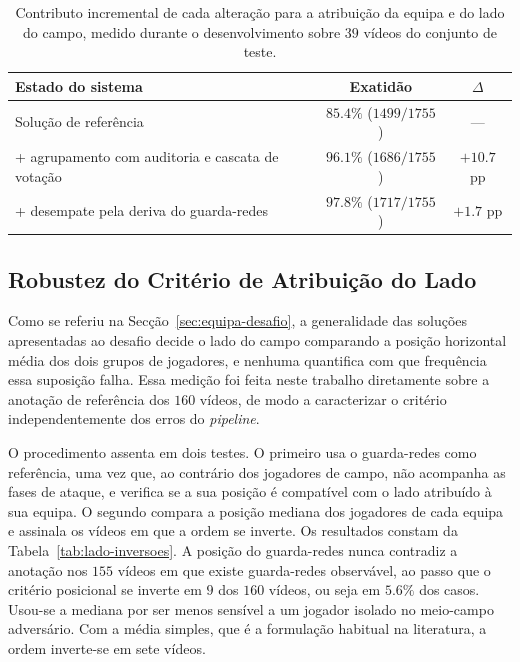 \begin{table}[htbp]
    \centering
    \caption{Contributo incremental de cada alteração para a atribuição da equipa e do lado do
    campo, medido durante o desenvolvimento sobre $39$ vídeos do conjunto de teste.}
    \label{tab:team-resultados}
    \begin{tabular}{|l|c|c|}
        \hline
        \textbf{Estado do sistema} & \textbf{Exatidão} & \textbf{$\Delta$} \\
        \hline
        Solução de referência                              & $85.4\%$ ($1499/1755$) & --- \\
        \hline
        + agrupamento com auditoria e cascata de votação   & $96.1\%$ ($1686/1755$) & $+10.7$ pp \\
        \hline
        + desempate pela deriva do guarda-redes            & $97.8\%$ ($1717/1755$) & $+1.7$ pp \\
        \hline
    \end{tabular}
\end{table}

\subsection{Robustez do Critério de Atribuição do Lado}\label{sec:res_lado_quantificacao}

Como se referiu na Secção~\ref{sec:equipa-desafio}, a generalidade das soluções apresentadas ao
desafio decide o lado do campo comparando a posição horizontal média dos dois grupos de jogadores,
e nenhuma quantifica com que frequência essa suposição falha. Essa medição foi feita neste trabalho
diretamente sobre a anotação de referência dos $160$ vídeos, de modo a caracterizar o critério
independentemente dos erros do \emph{pipeline}.

O procedimento assenta em dois testes. O primeiro usa o guarda-redes como referência, uma vez que,
ao contrário dos jogadores de campo, não acompanha as fases de ataque, e verifica se a sua posição
é compatível com o lado atribuído à sua equipa. O segundo compara a posição mediana dos jogadores
de cada equipa e assinala os vídeos em que a ordem se inverte. Os resultados constam da
Tabela~\ref{tab:lado-inversoes}. A posição do guarda-redes nunca contradiz a anotação nos $155$
vídeos em que existe guarda-redes observável, ao passo que o critério posicional se inverte em $9$
dos $160$ vídeos, ou seja em $5.6\%$ dos casos. Usou-se a mediana por ser menos sensível a um
jogador isolado no meio-campo adversário. Com a média simples, que é a formulação habitual na
literatura, a ordem inverte-se em sete vídeos.

